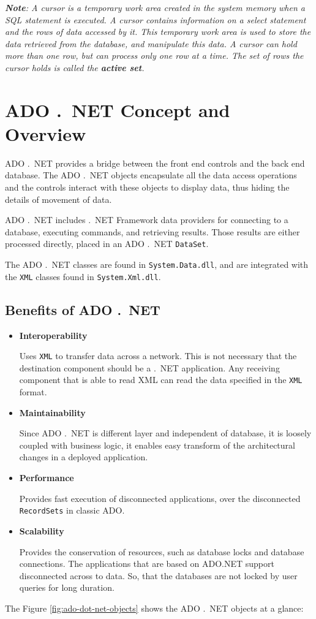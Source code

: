 \emph{\textbf{Note}: A cursor is a temporary work area created in the system memory when a SQL statement is
executed. A cursor contains information on a select statement and the rows of data accessed by it.
This temporary work area is used to store the data retrieved from the database, and manipulate this
data. A cursor can hold more than one row, but can process only one row at a time. The set of rows the
cursor holds is called the \textbf{active set}.}




\section{ADO .\ NET Concept and Overview}
ADO .\ NET provides a bridge between the front end controls and the back end
database. The ADO .\ NET objects encapsulate all the data access operations and the controls interact with these objects to display data, thus hiding the details of
movement of data.

ADO .\ NET includes .\ NET Framework data providers for connecting to a database, executing commands, and retrieving results. Those results are either processed directly, placed in an ADO .\ NET \texttt{DataSet}. 


The ADO .\ NET classes are found in \texttt{System.Data.dll}, and are integrated with the \texttt{XML} classes found in \texttt{System.Xml.dll}.

\subsection*{Benefits of ADO .\ NET}

\begin{itemize}
	\item \textbf{Interoperability}
	
	Uses \texttt{XML} to transfer data across a network. This is not necessary that the destination	component should be a .\ NET application. Any receiving component that is able to read XML can read the
	data specified in the \texttt{XML} format.
	
	\item \textbf{Maintainability}
	
	Since ADO .\ NET is different layer and independent of database, it is loosely coupled with business logic, it enables easy transform of the architectural changes in a deployed application.
	
	\item \textbf{Performance}
	
	Provides fast execution of disconnected applications, over the disconnected \texttt{RecordSets} in classic ADO.
	
	\item \textbf{Scalability}
	
	Provides the conservation of resources, such as database locks and database connections.
	The applications that are based on ADO.NET support disconnected across to data. So, that the databases
	are not locked by user queries for long duration.
\end{itemize}
The Figure {\ref{fig:ado-dot-net-objects}} shows the ADO .\ NET objects at a glance:

